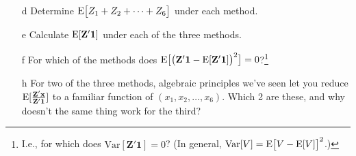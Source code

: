 \documentclass{article}
\begin{document}
\begin{enumerate}
\begin{minipage}{.45\linewidth}
\begin{itemize}
\item[d] Determine $\mathrm{E}\big[  Z_{1} + Z_{2} + \cdots + Z_{6} \big]$ under each method.
\item[e] Calculate $\mathrm{E}[\mathbf{Z}'\mathbf{1}]$ under each of the three methods.
\end{itemize}
\end{minipage}
% 
\begin{minipage}{.45\linewidth}
  \begin{itemize}
 \item[f] For which of the methods does $\mathrm{E}
  \big[\big(\mathbf{Z}'\mathbf{1} -\mathrm{E} [\mathbf{Z}'\mathbf{1}]\big)^{2}\big] =
  0$?\footnote{I.e., for which does
    $\mathrm{Var}[\mathbf{Z}'\mathbf{1}] = 0$?  (In general,
    $\mathrm{Var}[V] = \mathrm{E} \big[V - \mathrm{E}[V] \big]^{2} $.)}
\item[h] For two of the three methods, algebraic principles we've seen
  let you reduce
  $\mathrm{E} [\frac{\mathbf{Z}'\mathbf{x}}{\mathbf{Z}'\mathbf{1}}]$ to a
  familiar function of $(x_{1}, x_{2}, \ldots, x_{6}) $.  Which 2 are
  these, and why doesn't the same thing work for the third?

  \end{itemize}
\end{minipage}
\end{enumerate}
\end{document}
